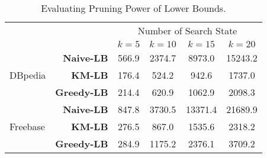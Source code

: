 \vspace{-0.1in}
\begin{table} [h]
\begin{tabular}
{ l | r | c  c  c c }
\hline
\multirow{2}{*}{} & \multirow{2}{*}{} & \multicolumn{4}{c}{Number of Search State} \\
\cline{3-6}
& & $k=5$ & $k=10$ & $k=15 $& $k=20$ \\
\hline
\multirow{3}{*}{\begin{minipage}{0.38in}DBpedia\end{minipage}} 
& \textbf{Naive-LB}  & 566.9 & 2374.7 & 8973.0 & 15243.2 \\
& \textbf{KM-LB}     & 176.4 & 524.2  & 942.6  & 1737.0 \\
& \textbf{Greedy-LB} & 214.4 & 620.9  & 1062.9 & 2098.3 \\
\hline
\multirow{3}{*}{\begin{minipage}{0.38in}Freebase\end{minipage}} 
& \textbf{Naive-LB}  & 847.8 & 3730.5 & 13371.4 & 21689.9 \\
& \textbf{KM-LB}     & 276.5 & 867.0  & 1535.6  & 2318.2 \\
& \textbf{Greedy-LB} & 284.9 & 1175.2  & 2376.1 & 3709.2 \\
\hline
\end{tabular}
\caption{Evaluating Pruning Power of Lower Bounds. }
\label{tab:search_state_cnt}
\vspace{-0.4in}
\end{table}



